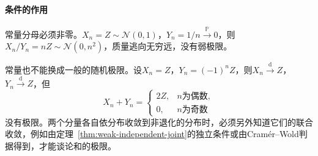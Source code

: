 \paragraph{条件的作用}
常量分母必须非零。$X_n=Z\sim\mathcal{N}(0,1)$，$Y_n=1/n\xrightarrow{\mathbb{P}}0$，则$X_n/Y_n=nZ\sim\mathcal{N}(0,n^{2})$，质量逃向无穷远，没有弱极限。

常量也不能换成一般的随机极限。设$X_n=Z$，$Y_n=(-1)^{n}Z$，则$X_n\xrightarrow{\mathrm{d}}Z$，$Y_n\xrightarrow{\mathrm{d}}Z$，但
\[
 X_n+Y_n=\begin{cases}2Z,&n\text{为偶数},\\0,&n\text{为奇数}\end{cases}
\]
没有极限。两个分量各自依分布收敛到非退化的分布时，必须另外知道它们的联合收敛，例如由定理~\ref{thm:weak-independent-joint}的独立条件或由Cramér--Wold判据得到，才能谈论和的极限。
